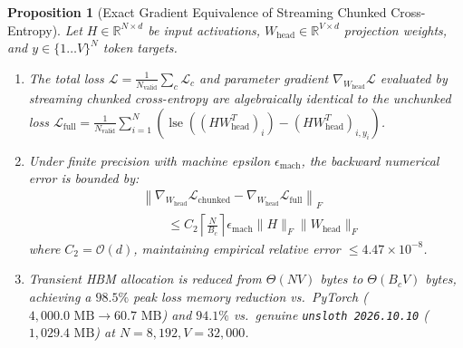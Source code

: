 \documentclass[10pt,twocolumn,letterpaper]{article}
\newtheorem{proposition}{Proposition}
\begin{document}
\begin{proposition}[Exact Gradient Equivalence of Streaming Chunked Cross-Entropy]
\label{prop:chunked_ce}
Let $H \in \mathbb{R}^{N \times d}$ be input activations, $W_{\text{head}} \in \mathbb{R}^{V \times d}$ projection weights, and $y \in \{1 \dots V\}^N$ token targets.
\begin{enumerate}
    \item The total loss $\mathcal{L} = \frac{1}{N_{\text{valid}}} \sum_{c} \mathcal{L}_c$ and parameter gradient $\nabla_{W_{\text{head}}} \mathcal{L}$ evaluated by streaming chunked cross-entropy are algebraically identical to the unchunked loss $\mathcal{L}_{\text{full}} = \frac{1}{N_{\text{valid}}} \sum_{i=1}^N \left( \operatorname{lse}((H W_{\text{head}}^T)_i) - (H W_{\text{head}}^T)_{i, y_i} \right)$.
    \item Under finite precision with machine epsilon $\epsilon_{\text{mach}}$, the backward numerical error is bounded by:
    \begin{equation}
    \begin{aligned}
        &\left\| \nabla_{W_{\text{head}}} \mathcal{L}_{\text{chunked}} - \nabla_{W_{\text{head}}} \mathcal{L}_{\text{full}} \right\|_F \\
        &\qquad \le C_2 \left\lceil \frac{N}{B_c} \right\rceil \epsilon_{\text{mach}} \|H\|_F \|W_{\text{head}}\|_F
    \end{aligned}
    \end{equation}
    where $C_2 = \mathcal{O}(d)$, maintaining empirical relative error $\le 4.47 \times 10^{-8}$.
    \item Transient HBM allocation is reduced from $\Theta(N V)$ bytes to $\Theta(B_c V)$ bytes, achieving a $98.5\%$ peak loss memory reduction vs.\ PyTorch ($4,000.0\text{ MB} \to 60.7\text{ MB}$) and $94.1\%$ vs.\ genuine \texttt{unsloth 2026.10.10} ($1,029.4\text{ MB}$) at $N=8,192, V=32,000$.
\end{enumerate}
\end{proposition}
\end{document}
